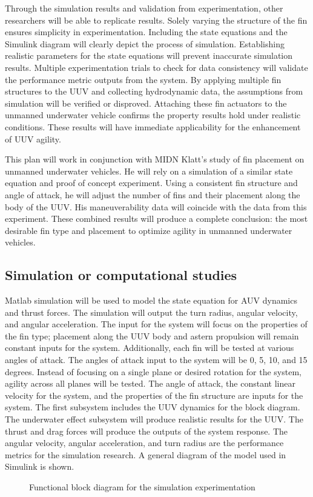 \documentclass{IEEEtran}
\begin{document}
Through the simulation results and validation from experimentation, other researchers will be able to replicate results.  Solely varying the structure of the fin ensures simplicity in experimentation.  Including the state equations and the Simulink diagram will clearly depict the process of simulation.  Establishing realistic parameters for the state equations will prevent inaccurate simulation results.  Multiple experimentation trials to check for data consistency will validate the performance metric outputs from the system.  By applying multiple fin structures to the UUV and collecting hydrodynamic data, the assumptions from simulation will be verified or disproved.  Attaching these fin actuators to the unmanned underwater vehicle confirms the property results hold under realistic conditions.  These results will have immediate applicability for the enhancement of UUV agility.  

This plan will work in conjunction with MIDN Klatt’s study of fin placement on unmanned underwater vehicles.  He will rely on a simulation of a similar state equation and proof of concept experiment.  Using a consistent fin structure and angle of attack, he will adjust the number of fins and their placement along the body of the UUV.  His maneuverability data will coincide with the data from this experiment.  These combined results will produce a complete conclusion: the most desirable fin type and placement to optimize agility in unmanned underwater vehicles.

\subsection{Simulation or computational studies}
Matlab simulation will be used to model the state equation for AUV dynamics and thrust forces.  The simulation will output the turn radius, angular velocity, and angular acceleration.  The input for the system will focus on the properties of the fin type; placement along the UUV body and astern propulsion will remain constant inputs for the system.  Additionally, each fin will be tested at various angles of attack.  The angles of attack input to the system will be 0, 5, 10, and 15 degrees.  Instead of focusing on a single plane or desired rotation for the system, agility across all planes will be tested.  The angle of attack, the constant linear velocity for the system, and the properties of the fin structure are inputs for the system.  The first subsystem includes the UUV dynamics for the block diagram.  The underwater effect subsystem will produce realistic results for the UUV.  The thrust and drag forces will produce the outputs of the system response.  The angular velocity, angular acceleration, and turn radius are the performance metrics for the simulation research.  A general diagram of the model used in Simulink is shown. 
\begin{figure}
\caption{Functional block diagram for the simulation experimentation}
\label{fig:3}
\end{figure}
\end{document}
